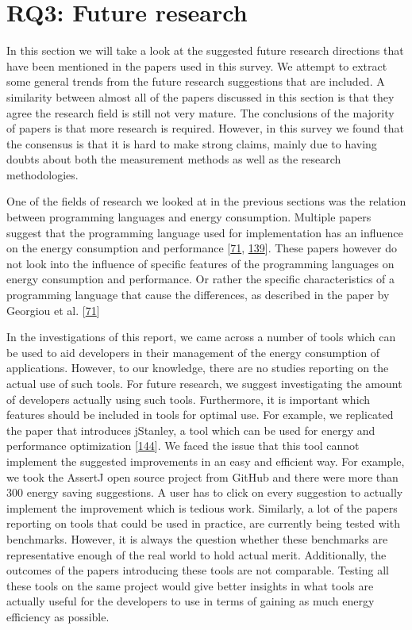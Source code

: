 \documentclass[]{book}
\begin{document}
\section{RQ3: Future research}\label{rq3-future-research-1}

In this section we will take a look at the suggested future research
directions that have been mentioned in the papers used in this survey.
We attempt to extract some general trends from the future research
suggestions that are included. A similarity between almost all of the
papers discussed in this section is that they agree the research field
is still not very mature. The conclusions of the majority of papers is
that more research is required. However, in this survey we found that
the consensus is that it is hard to make strong claims, mainly due to
having doubts about both the measurement methods as well as the research
methodologies.

One of the fields of research we looked at in the previous sections was
the relation between programming languages and energy consumption.
Multiple papers suggest that the programming language used for
implementation has an influence on the energy consumption and
performance {[}\protect\hyperlink{ref-GKLS2018}{71},
\protect\hyperlink{ref-OOC2017}{139}{]}. These papers however do not
look into the influence of specific features of the programming
languages on energy consumption and performance. Or rather the specific
characteristics of a programming language that cause the differences, as
described in the paper by Georgiou et al.
{[}\protect\hyperlink{ref-GKLS2018}{71}{]}

In the investigations of this report, we came across a number of tools
which can be used to aid developers in their management of the energy
consumption of applications. However, to our knowledge, there are no
studies reporting on the actual use of such tools. For future research,
we suggest investigating the amount of developers actually using such
tools. Furthermore, it is important which features should be included in
tools for optimal use. For example, we replicated the paper that
introduces jStanley, a tool which can be used for energy and performance
optimization {[}\protect\hyperlink{ref-PSCS2018}{144}{]}. We faced the
issue that this tool cannot implement the suggested improvements in an
easy and efficient way. For example, we took the AssertJ open source
project from GitHub and there were more than 300 energy saving
suggestions. A user has to click on every suggestion to actually
implement the improvement which is tedious work. Similarly, a lot of the
papers reporting on tools that could be used in practice, are currently
being tested with benchmarks. However, it is always the question whether
these benchmarks are representative enough of the real world to hold
actual merit. Additionally, the outcomes of the papers introducing these
tools are not comparable. Testing all these tools on the same project
would give better insights in what tools are actually useful for the
developers to use in terms of gaining as much energy efficiency as
possible.
\end{document}
